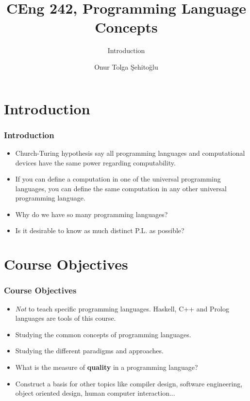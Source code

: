 \usepackage{pgfpages}
\usepackage{etex}
\usepackage[utf8]{inputenc}

{
  \usepackage{fullpage}
  \usepackage{pgf}
  \usepackage{hyperref}
}

{
}


\title{CEng 242, Programming Language Concepts}
\author{Onur Tolga Şehitoğlu}
\subtitle{Introduction}
\date{}

\titlegraphic{\insertmetutitle\insertlicense}


\frame[plain]{\maketitle}
\section{Introduction}
\begin{frame}
\frametitle{Introduction}
\begin{itemize}
 \item Church-Turing hypothesis say all programming languages and computational devices have the same power regarding computability.
\item If you can define a computation in one of the universal programming languages, you can define the same computation in any other universal programming language. 
\item Why do we have so many programming languages?
\item Is it desirable to know as much distinct P.L. as possible?
\end{itemize}
\end{frame}

\section{Course Objectives}
\begin{frame}
 \frametitle{Course Objectives}
\begin{itemize}
 \item {\em Not\/} to teach specific programming languages. \textsf{Haskell}, \textsf{C++} and \textsf{Prolog} languages are tools of this course.
\item  Studying the common concepts of programming languages.
\item Studying the different paradigms and approaches.
\item What is the measure of \textbf{quality} in a programming language?
\item Construct a basis for other topics like compiler design, software engineering, object oriented design, human computer interaction...
\end{itemize}
\end{frame}

